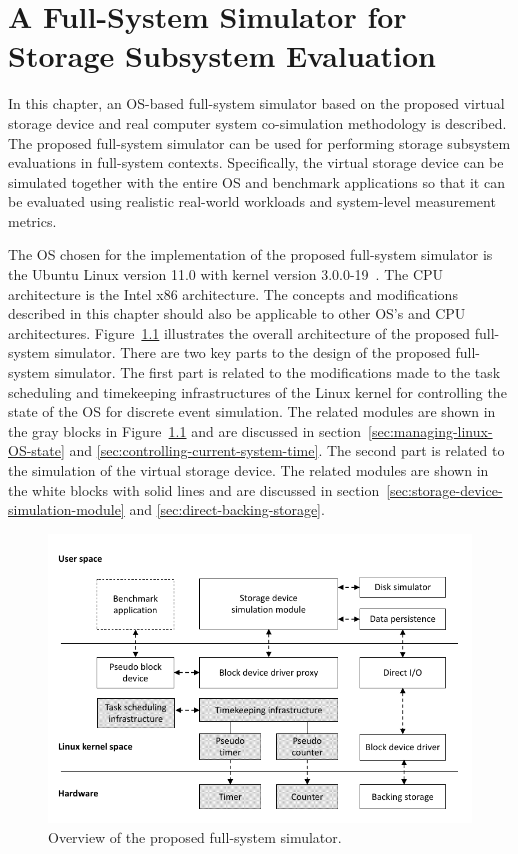 \chapter{A Full-System Simulator for Storage Subsystem Evaluation}
\label{ch:5}

In this chapter, an OS-based full-system simulator based on the proposed virtual storage device and real computer system co-simulation methodology is described. The proposed full-system simulator can be used for performing storage subsystem evaluations in full-system contexts. Specifically, the virtual storage device can be simulated together with the entire OS and benchmark applications so that it can be evaluated using realistic real-world workloads and system-level measurement metrics.

The OS chosen for the implementation of the proposed full-system simulator is the Ubuntu Linux version 11.0 with kernel version 3.0.0-19~\cite{Ubuntu:2013}. The CPU architecture is the Intel x86 architecture. The concepts and modifications described in this chapter should also be applicable to other OS's and CPU architectures. Figure~\ref{fig:ch5-full-system-simulator} illustrates the overall architecture of the proposed full-system simulator. There are two key parts to the design of the proposed full-system simulator. The first part is related to the modifications made to the task scheduling and timekeeping infrastructures of the Linux kernel for controlling the state of the OS for discrete event simulation. The related modules are shown in the gray blocks in Figure~\ref{fig:ch5-full-system-simulator} and are discussed in section~\ref{sec:managing-linux-OS-state} and \ref{sec:controlling-current-system-time}. The second part is related to the simulation of the virtual storage device. The related modules are shown in the white blocks with solid lines and are discussed in section~\ref{sec:storage-device-simulation-module} and \ref{sec:direct-backing-storage}.

\begin{figure}[htpb!]
	\centering
	\includegraphics[width=1\textwidth]{figures/ch5-full-system-simulator.pdf}
	\caption{\label{fig:ch5-full-system-simulator}Overview of the proposed full-system simulator.}
\end{figure}

